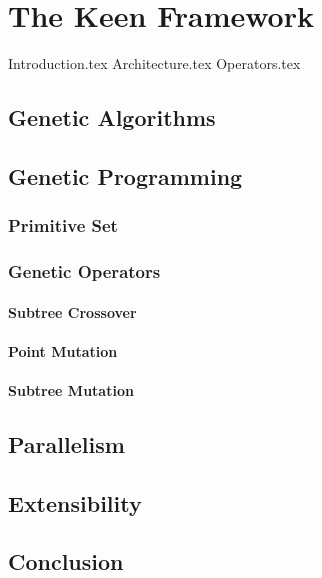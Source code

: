 \chapter{The Keen Framework}
\label{chap:keen}
  {Introduction.tex}
  {Architecture.tex}
  {Operators.tex}
\section{Genetic Algorithms}
  \label{sec:genetic_algorithms}
    \Blindtext
  \section{Genetic Programming}
  \label{sec:genetic_programming}
    \subsection{Primitive Set}
    \label{sec:keen:gp:primitive_set}
      \Blindtext
    \subsection{Genetic Operators}
    \label{sec:keen:gp:operators}
      \subsubsection{Subtree Crossover}
      \label{sec:keen:gp:operators:crossover:subtree}
        \Blindtext
      \subsubsection{Point Mutation}
      \label{sec:keen:gp:operators:mutation:point}
        \Blindtext
      \subsubsection{Subtree Mutation}
      \label{sec:keen:operators:mutation:subtree}
        \Blindtext
  \section{Parallelism}
  \label{sec:parallelism}
    \Blindtext
  \section{Extensibility}
  \label{sec:extensibility}
    \Blindtext
  \section{Conclusion}
  \label{sec:conclusion}
    \Blindtext
